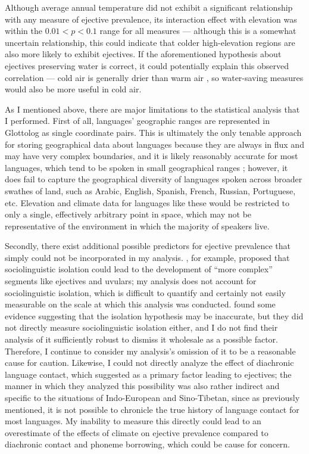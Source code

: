 \documentclass{article}
\begin{document}
Although average annual temperature did not exhibit a significant relationship with any measure of ejective prevalence, its interaction effect with elevation was within the $0.01 < p < 0.1$ range for all measures --- although this is a somewhat uncertain relationship, this could indicate that colder high-elevation regions are also more likely to exhibit ejectives. If the aforementioned hypothesis about ejectives preserving water is correct, it could potentially explain this observed correlation --- cold air is generally drier than warm air \parencite{koskela2007}, so water-saving measures would also be more useful in cold air.

As I mentioned above, there are major limitations to the statistical analysis that I performed. First of all, languages' geographic ranges are represented in Glottolog as single coordinate pairs. This is ultimately the only tenable approach for storing geographical data about languages because they are always in flux and may have very complex boundaries, and it is likely reasonably accurate for most languages, which tend to be spoken in small geographical ranges \parencite{hua2019}; however, it does fail to capture the geographical diversity of languages spoken across broader swathes of land, such as Arabic, English, Spanish, French, Russian, Portuguese, etc. Elevation and climate data for languages like these would be restricted to only a single, effectively arbitrary point in space, which may not be representative of the environment in which the majority of speakers live. 

Secondly, there exist additional possible predictors for ejective prevalence that simply could not be incorporated in my analysis. \textcite{nichols2014}, for example, proposed that sociolinguistic isolation could lead to the development of ``more complex'' segments like ejectives and uvulars; my analysis does not account for sociolinguistic isolation, which is difficult to quantify and certainly not easily measurable on the scale at which this analysis was conducted. \textcite{urban2021} found some evidence suggesting that the isolation hypothesis may be inaccurate, but they did not directly measure sociolinguistic isolation either, and I do not find their analysis of it sufficiently robust to dismiss it wholesale as a possible factor. Therefore, I continue to consider my analysis's omission of it to be a reasonable cause for caution. Likewise, I could not directly analyze the effect of diachronic language contact, which \textcite{urban2021} suggested as a primary factor leading to ejectives; the manner in which they analyzed this possibility was also rather indirect and specific to the situations of Indo-European and Sino-Tibetan, since as previously mentioned, it is not possible to chronicle the true history of language contact for most languages. My inability to measure this directly could lead to an overestimate of the effects of climate on ejective prevalence compared to diachronic contact and phoneme borrowing, which could be cause for concern. 
\end{document}
